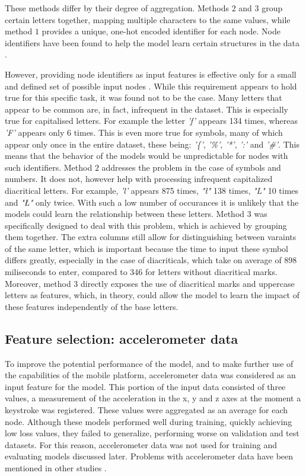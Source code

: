 These methods differ by their degree of aggregation. Methods $2$ and $3$ group certain letters together, mapping multiple characters to the same values, while method $1$ provides a unique, one-hot encoded identifier for each node. Node identifiers have been found to help the model learn certain structures in the data \cite{you2021identityawaregraphneuralnetworks}. 

However, providing node identifiers as input features is effective only for a small and defined set of possible input nodes \cite{Lesk2024}. While this requirement appears to hold true for this specific task, it was found not to be the case.
Many letters that appear to be common are, in fact, infrequent in the dataset. This is especially true for capitalised letters. For example the letter \textit{'f'} appears 134 times, whereas \textit{'F'} appears only 6 times. This is even more true for symbols, many of which appear only once in the entire dataset, these being: \textit{'\{'}, \textit{'\%'}, \textit{'*'}, \textit{':'} and \textit{'\#'}.
This means that the behavior of the models would be unpredictable for nodes with such identifiers.
Method $2$ addresses the problem in the case of symbols and numbers. It does not, however help with processing infrequent capitalized diacritical letters. For example, \textit{'l'} appears 875 times, \textit{"ł"} 138 times, \textit{"L"} 10 times and \textit{"Ł"} only twice. With such a low number of occurances it is unlikely that the models could learn the relationship between these letters.
Method $3$ was specifically designed to deal with this problem, which is achieved by grouping them together. The extra columns still allow for distinguishing between varaints of the same letter, which is important because the time to input these symbol differs greatly, especially in the case of diacriticals, which take on average of 898 miliseconds to enter, compared to 346 for letters without diacritical marks.
Moreover, method $3$ directly exposes the use of diacritical marks and uppercase letters as features, which, in theory, could allow the model to learn the impact of these features independently of the base letters. 

\subsection{Feature selection: accelerometer data} \label{accel_subsection}
To improve the potential performance of the model, and to make further use of the capabilities of the mobile platform, accelerometer data was considered as an input feature for the model.
This portion of the input data consisted of three values, a measurement of the acceleration in the x, y and z axes at the moment a keystroke was registered. 
These values were aggregated as an average for each node. Although these models performed well during training, quickly achieving low loss values, they failed to generalize, performing worse on validation and test datasets. For this reason, accelerometer data was not used for training and evaluating models discussed later. Problems with accelerometer data have been mentioned in other studies \cite{maiorana2021}.

